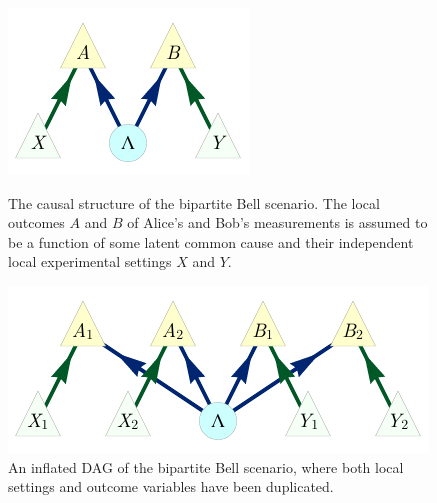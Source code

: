 
\begin{figure}[ht]
\centering
\begin{minipage}[t]{0.45\linewidth}
\centering
\includegraphics[scale=1]{BellDagRaw.pdf}
\caption{The causal structure of the bipartite Bell scenario. The local outcomes $A$ and $B$ of Alice's and Bob's measurements is assumed to be a function of some latent common cause and their independent local experimental settings $X$ and $Y$.}\label{fig:NewBellDAG1}
\end{minipage}
\hfill
\begin{minipage}[t]{0.45\linewidth}
\centering
\includegraphics[scale=1]{BellDagCopy.pdf}
\caption{An inflated DAG of the bipartite Bell scenario, where both local settings and outcome variables have been duplicated.}\label{fig:BellDagCopy1}
\end{minipage}
\end{figure}


